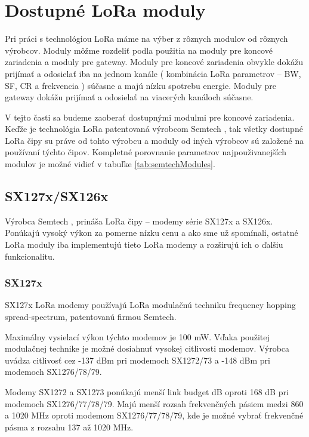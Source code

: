 \documentclass[slovak,master]{diploma}
\begin{document}
\chapter{Dostupné LoRa moduly }
Pri práci s technológiou LoRa máme na výber z rôznych modulov od rôznych výrobcov.
Moduly môžme rozdeliť podla použitia na moduly pre koncové zariadenia a moduly pre gateway.
Moduly pre koncové zariadenia obvykle dokážu prijímať a odosielať iba na jednom kanále ( kombinácia LoRa parametrov --  BW, SF, CR a frekvencia ) súčasne a majú 
nízku spotrebu energie. Moduly pre gateway dokážu prijímať a odosielať na viacerých kanáloch súčasne.

V tejto časti sa budeme zaoberať dostupnými modulmi pre koncové zariadenia.
Keďže je technológia LoRa patentovaná výrobcom Semtech \cite{semtech}, tak všetky dostupné LoRa čipy su práve od tohto výrobcu a moduly od iných výrobcov 
sú založené na používaní týchto čipov. Kompletné porovnanie parametrov najpouživanejších modulov je možné vidieť v tabuľke \ref{tab:semtechModules}.

\section{SX127x/SX126x}
Výrobca Semtech \cite{semtech}, prináša LoRa čipy -- modemy série SX127x a SX126x. Ponúkajú vysoký výkon za pomerne nízku cenu a ako sme už spomínali, ostatné LoRa moduly 
iba implementujú tieto LoRa modemy a rozširujú ich o ďalšiu funkcionalitu.

\subsection{SX127x}
SX127x LoRa modemy používajú LoRa modulačnú techniku frequency hopping spread-spectrum, patentovanú firmou Semtech.

Maximálny vysielací výkon týchto modemov je 100 mW.
Vďaka použitej modulačnej technike je možné dosiahnuť vysokej citlivosti modemov.
Výrobca uvádza citlivosť cez -137 dBm pri modemoch SX1272/73 a -148 dBm pri modemoch SX1276/78/79.


Modemy SX1272 a SX1273 ponúkajú menší link budget  dB oproti 168 dB pri modemoch SX1276/77/78/79. 
\newpage
Majú menší rozsah frekvenčných pásiem medzi 860 a 1020 MHz oproti modemom SX1276/77/78/79, kde 
je možné vybrať frekvenčné pásma z rozsahu 137 až 1020 MHz.
\end{document}
